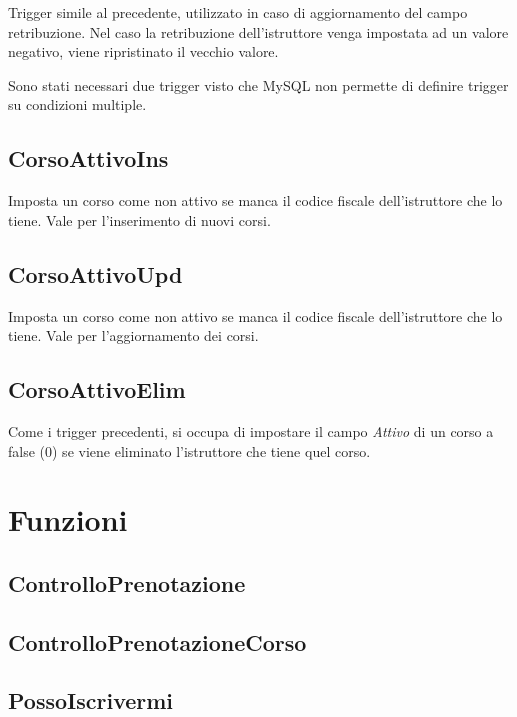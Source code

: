 Trigger simile al precedente, utilizzato in caso di aggiornamento del campo retribuzione. Nel caso la retribuzione dell'istruttore venga impostata ad un valore negativo, viene ripristinato il vecchio valore.

Sono stati necessari due trigger visto che MySQL non permette di definire trigger su condizioni multiple.

\subsection{CorsoAttivoIns}


Imposta un corso come non attivo se manca il codice fiscale dell'istruttore che lo tiene. Vale per l'inserimento di nuovi corsi.

\subsection{CorsoAttivoUpd}



Imposta un corso come non attivo se manca il codice fiscale dell'istruttore che lo tiene. Vale per l'aggiornamento dei corsi.

\subsection{CorsoAttivoElim}



Come i trigger precedenti, si occupa di impostare il campo \textit{Attivo} di un corso a false (0) se viene eliminato l'istruttore che tiene quel corso.

\section{Funzioni}

\subsection{ControlloPrenotazione}



\subsection{ControlloPrenotazioneCorso}



\subsection{PossoIscrivermi}

